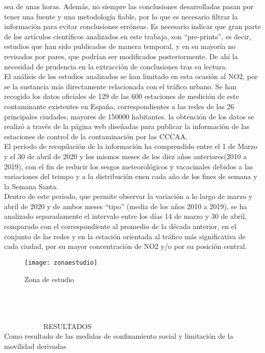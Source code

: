 \documentclass[a4paper,11pt]{article}
\begin{document}
sea de unas horas. Además, no siempre las conclusiones desarrolladas pasan por tener una fuente y una
metodología fiable, por lo que es necesario filtrar la información para evitar conclusiones erróneas. Es
necesario indicar que gran parte de los artículos científicos analizados en este trabajo, son “pre-prints”,
es decir, estudios que han sido publicados de manera temporal, y en su mayoría no revisados por pares,
que podrían ser modificados posteriormente. De ahí la necesidad de prudencia en la extracción de conclusiones
tras su lectura.
 \\ El análisis de los estudios analizados se han limitado en esta ocasión al NO2, por se la sustancia más directamente relacionada con el tráfico urbano. Se han recogido los datos oficiales de 129 de las 600 estaciones de medición de este contaminante existentes en España, correspondientes a las redes de las 26 principales ciudades, mayores de 150000 habitantes. la obtención de los datos se realizó a través de la página web diseñadas para publicar la información de las estaciones de control de la contaminación por las CCCAA.
\\El periodo de recopilación de la información ha comprendido entre el 1 de Marzo y el 30 de abril de 2020 y los mismos meses de los diez años anteriores(2010 a 2019), con el fin de reducir los sesgos meteorológicos y vacacinales debidos a las variaciones del teimpo y a la distribución enen cada año de los fines de semana y la Semana Santa.
\\Dentro de este periodo, que permite observar la variación a lo largo de marzo y abril de 2020 y
de ambos meses “tipo” (media de los años 2010 a 2019), se ha analizado separadamente el intervalo
entre los días 14 de marzo y 30 de abril, comparado con el correspondiente al promedio de la
década anterior, en el conjunto de las redes y en la estación orientada al tráfico más significativa
de cada ciudad, por su mayor concentración de NO2 y/o por su posición central.
\begin{figure}
\centering
\texttt{[image: zonaestudio]}
\caption{Zona de estudio}
\label{Figura1}
\end{figure}
\ \ \ \ \ \ \ \ \ \ \ \ \ \ \   \ \ \ \ \ \ \\ \ \ \ \ \ \ \ \ \ \ \ \ \ \   \ \ \ \ \ \ \\ \ \ \ \ \ \ \ \ \ \ \ \ \ \   \ \ \ \ \ \ \\ \ \ \ \ \ \ \ \ \ \ \ RESULTADOS
\\  Como resultado de las medidas de confinamiento social y limitación de la movilidad derivadas
\end{document}
